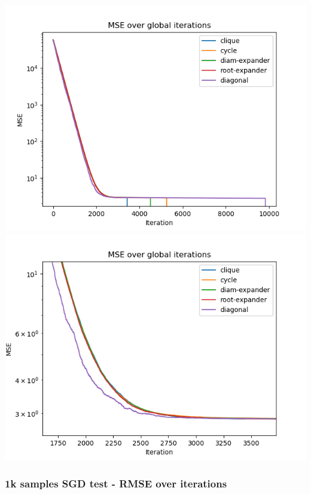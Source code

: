 \documentclass[11pt]{article}
\makeatletter
\def\maxwidth{\ifdim\Gin@nat@width>\linewidth\linewidth
    \else\Gin@nat@width\fi}
\let\Oldincludegraphics\includegraphics
\renewcommand{\includegraphics}[1]{\Oldincludegraphics[width=.8\maxwidth]{#1}}
\makeatother
\begin{document}
\includegraphics{media/img/tests/test_003_1ksamples_stochastic/2_mse_iter.png}
\includegraphics{media/img/tests/test_003_1ksamples_stochastic/2_mse_iter_zoom.png}

\subsubsection{1k samples SGD test - RMSE over
iterations}\label{k-samples-sgd-test---rmse-over-iterations}
\end{document}
